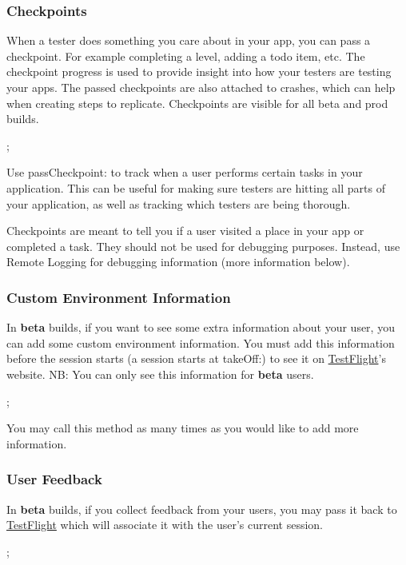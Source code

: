\subsubsection*{Checkpoints}

When a tester does something you care about in your app, you can pass a checkpoint. For example completing a level, adding a todo item, etc. The checkpoint progress is used to provide insight into how your testers are testing your apps. The passed checkpoints are also attached to crashes, which can help when creating steps to replicate. Checkpoints are visible for all beta and prod builds. \begin{DoxyVerb};
\end{DoxyVerb}


Use {\ttfamily pass\-Checkpoint\-:} to track when a user performs certain tasks in your application. This can be useful for making sure testers are hitting all parts of your application, as well as tracking which testers are being thorough.

Checkpoints are meant to tell you if a user visited a place in your app or completed a task. They should not be used for debugging purposes. Instead, use Remote Logging for debugging information (more information below).

\subsubsection*{Custom Environment Information}

In {\bfseries beta} builds, if you want to see some extra information about your user, you can add some custom environment information. You must add this information before the session starts (a session starts at {\ttfamily take\-Off\-:}) to see it on \hyperlink{interface_test_flight}{Test\-Flight}'s website. N\-B\-: You can only see this information for {\bfseries beta} users. \begin{DoxyVerb};
\end{DoxyVerb}


You may call this method as many times as you would like to add more information.

\subsubsection*{User Feedback}

In {\bfseries beta} builds, if you collect feedback from your users, you may pass it back to \hyperlink{interface_test_flight}{Test\-Flight} which will associate it with the user's current session. \begin{DoxyVerb};
\end{DoxyVerb}


